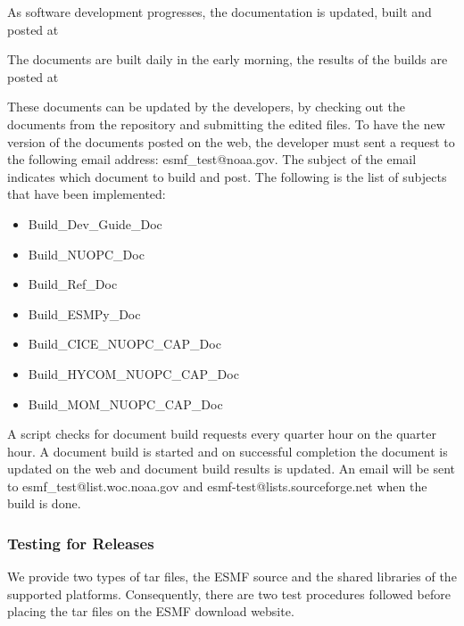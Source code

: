 As software development progresses, the documentation is updated, built and posted at

The documents are built daily in the early morning, the results of the builds are posted at

These documents can be updated by the developers, by checking out the documents from the repository and submitting the edited files. To have the new version of the documents posted on the web, the developer must sent a request to the following email address: esmf\_test@noaa.gov. The subject of the email indicates which document to build and post.
The following is the list of subjects that have been implemented:

\begin{itemize} 
\item Build\_Dev\_Guide\_Doc
\item Build\_NUOPC\_Doc
\item Build\_Ref\_Doc
\item Build\_ESMPy\_Doc
\item Build\_CICE\_NUOPC\_CAP\_Doc
\item Build\_HYCOM\_NUOPC\_CAP\_Doc
\item Build\_MOM\_NUOPC\_CAP\_Doc
\end{itemize}

A script checks for document build requests every quarter hour on the quarter hour. A document build is started and on successful completion the document is updated on the web and document build results is updated. An email will be sent to esmf\_test@list.woc.noaa.gov and esmf-test@lists.sourceforge.net when the build is done.


\subsubsection{Testing for Releases}

We provide two types of tar files, the ESMF source and the shared
libraries of the supported platforms. Consequently, there are two test
procedures followed before placing the tar files on the ESMF download website. 

